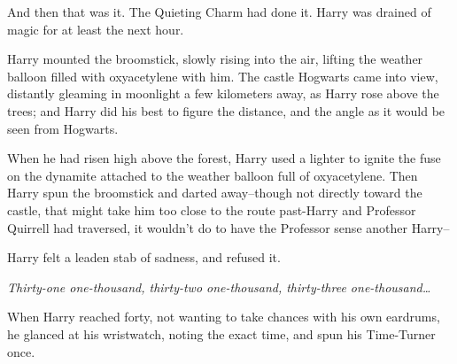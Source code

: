 And then that was it. The Quieting Charm had done it. Harry was drained of magic for at least the next hour.

Harry mounted the broomstick, slowly rising into the air, lifting the weather balloon filled with oxyacetylene with him. The castle Hogwarts came into view, distantly gleaming in moonlight a few kilometers away, as Harry rose above the trees; and Harry did his best to figure the distance, and the angle as it would be seen from Hogwarts.

When he had risen high above the forest, Harry used a lighter to ignite the fuse on the dynamite attached to the weather balloon full of oxyacetylene. Then Harry spun the broomstick and darted away\---though not directly toward the castle, that might take him too close to the route past-Harry and Professor Quirrell had traversed, it wouldn't do to have the Professor sense another Harry\---

Harry felt a leaden stab of sadness, and refused it.

\emph{Thirty-one one-thousand, thirty-two one-thousand, thirty-three one-thousand{\ldots}}

When Harry reached forty, not wanting to take chances with his own eardrums, he glanced at his wristwatch, noting the exact time, and spun his Time-Turner once.

